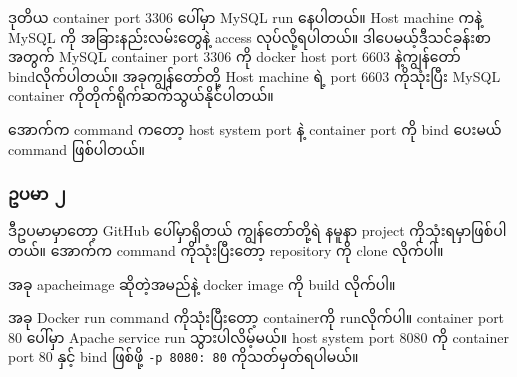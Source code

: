 ဒုတိယ container port 3306 ပေါ်မှာ MySQL run နေပါတယ်။ Host machine ကနဲ့
MySQL ကို အခြားနည်းလမ်းတွေနဲ့ access လုပ်လို့ရပါတယ်။
ဒါပေမယ့်ဒီသင်ခန်းစာအတွက် MySQL container port 3306 ကို docker host port
6603 နဲ့ကျွန်တော် bindလိုက်ပါတယ်။ အခုကျွန်တော်တို့ Host machine ရဲ့ port
6603 ကိုသုံးပြီး MySQL container ကိုတိုက်ရိုက်ဆက်သွယ်နိုင်ပါတယ်။

အောက်က command ကတော့ host system port နဲ့ container port ကို bind ပေးမယ်
command ဖြစ်ပါတယ်။

\begin{Shaded}
\begin{Highlighting}[]
\NormalTok{$ }
\NormalTok{$ }
\end{Highlighting}
\end{Shaded}

\hypertarget{ux1025ux1015ux1019ux102c-ux1042-1}{%
\subsubsection{ဥပမာ ၂}\label{ux1025ux1015ux1019ux102c-ux1042-1}}

ဒီဥပမာမှာတော့ GitHub ပေါ်မှာရှိတယ် ကျွန်တော်တို့ရဲ နမူနာ project
ကိုသုံးရမှာဖြစ်ပါတယ်။ အောက်က command ကိုသုံးပြီးတော့ repository ကို
clone လိုက်ပါ။

\begin{Shaded}
\begin{Highlighting}[]
\NormalTok{$ }
\NormalTok{$ }
\end{Highlighting}
\end{Shaded}

အခု apacheimage ဆိုတဲ့အမည်နဲ့ docker image ကို build လိုက်ပါ။

\begin{Shaded}
\begin{Highlighting}[]
\NormalTok{$ }
\end{Highlighting}
\end{Shaded}

အခု Docker run command ကိုသုံးပြီး‌တော့ containerကို runလိုက်ပါ။
container port 80 ပေါ်မှာ Apache service run သွားပါလိမ့်မယ်။ host system
port 8080 ကို container port 80 နှင့် bind ဖြစ်ဖို့
\texttt{-p\ 8080:\ 80} ကိုသတ်မှတ်ရပါမယ်။

\begin{Shaded}
\begin{Highlighting}[]
\NormalTok{$ }
\end{Highlighting}
\end{Shaded}

